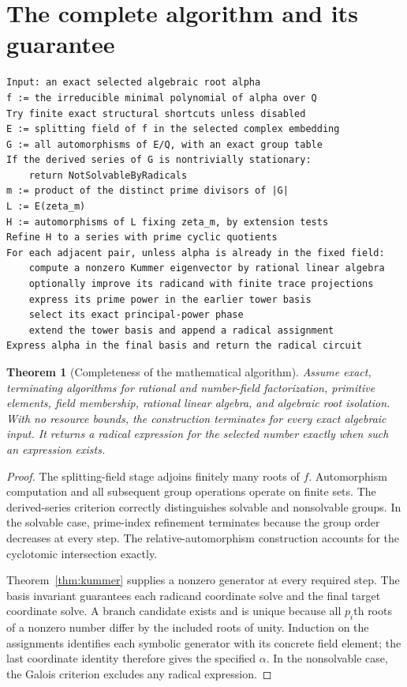 \documentclass[11pt,a4paper]{article}
\newtheorem{theorem}{Theorem}[section]
\theoremstyle{definition}\newtheorem{definition}[theorem]{Definition}
\theoremstyle{remark}\newtheorem{remark}[theorem]{Remark}
\begin{document}
\section{The complete algorithm and its guarantee}
\begin{lstlisting}
Input: an exact selected algebraic root alpha
f := the irreducible minimal polynomial of alpha over Q
Try finite exact structural shortcuts unless disabled
E := splitting field of f in the selected complex embedding
G := all automorphisms of E/Q, with an exact group table
If the derived series of G is nontrivially stationary:
    return NotSolvableByRadicals
m := product of the distinct prime divisors of |G|
L := E(zeta_m)
H := automorphisms of L fixing zeta_m, by extension tests
Refine H to a series with prime cyclic quotients
For each adjacent pair, unless alpha is already in the fixed field:
    compute a nonzero Kummer eigenvector by rational linear algebra
    optionally improve its radicand with finite trace projections
    express its prime power in the earlier tower basis
    select its exact principal-power phase
    extend the tower basis and append a radical assignment
Express alpha in the final basis and return the radical circuit
\end{lstlisting}

\begin{theorem}[Completeness of the mathematical algorithm]
Assume exact, terminating algorithms for rational and number-field
factorization, primitive elements, field membership, rational linear algebra,
and algebraic root isolation. With no resource bounds, the construction
terminates for every exact algebraic input. It returns a radical expression
for the selected number exactly when such an expression exists.
\end{theorem}
\begin{proof}
The splitting-field stage adjoins finitely many roots of $f$. Automorphism
computation and all subsequent group operations operate on finite sets.
The derived-series criterion correctly distinguishes solvable and
nonsolvable groups. In the solvable case, prime-index refinement terminates
because the group order decreases at every step. The relative-automorphism
construction accounts for the cyclotomic intersection exactly.

Theorem~\ref{thm:kummer} supplies a nonzero generator at every required step.
The basis invariant guarantees each radicand coordinate solve and the final
target coordinate solve. A branch candidate exists and is unique because
all $p_i$th roots of a nonzero number differ by the included roots of unity.
Induction on the assignments identifies each symbolic generator with its
concrete field element; the last coordinate identity therefore gives the
specified $\alpha$. In the nonsolvable case, the Galois criterion excludes
any radical expression.
\end{proof}
\end{document}
